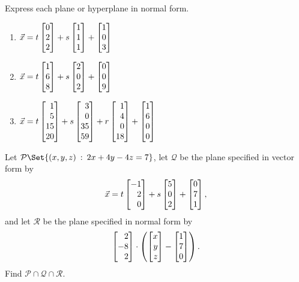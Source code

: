 \begin{exercises}
\begin{problist}
		\prob Express each plane or hyperplane in normal form.
		\begin{enumerate}
			\item $\vec x = t\mat{0\\2\\2}+s\mat{1\\1\\1}+\mat{1\\0\\3}$
			\item $\vec x = t\mat{1\\6\\8}+s\mat{2\\0\\2}+\mat{0\\0\\9}$
			\item $\vec x = t\mat{1\\5\\15\\20}+s\mat{3\\0\\35\\59}+
			r\mat{1\\4\\0\\18}+\mat{1\\6\\0\\0}$
		\end{enumerate}

		\prob
		Let $\mathcal P
			\Set{(x,y,z)\given 2x+4y-4z=7}
		$,
		let $\mathcal Q$ be the plane specified in vector form by
		\[
			\vec x = t\mat{-1\\2\\0}+s\mat{5\\0\\2}+\mat{0\\7\\1},
		\]
		and let $\mathcal R$ be the plane specified in normal form by
		\[
			\mat{2\\-8\\2} \cdot \left(\mat{x\\y\\z}-\mat{1\\7\\0}\right).
		\]
		Find $\mathcal P\cap\mathcal Q\cap\mathcal R$.

	\end{problist}
\end{exercises}
